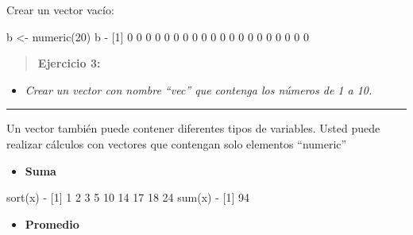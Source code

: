 \documentclass[
]{book}
\newenvironment{Shaded}{\begin{snugshade}}{\end{snugshade}}
\newcommand{\DecValTok}[1]{\textcolor[rgb]{0.00,0.00,0.81}{#1}}
\newcommand{\FunctionTok}[1]{\textcolor[rgb]{0.00,0.00,0.00}{#1}}
\newcommand{\NormalTok}[1]{#1}
\newcommand{\OtherTok}[1]{\textcolor[rgb]{0.56,0.35,0.01}{#1}}
\newcommand{\SpecialCharTok}[1]{\textcolor[rgb]{0.00,0.00,0.00}{#1}}
\providecommand{\tightlist}{%
  \setlength{\itemsep}{0pt}\setlength{\parskip}{0pt}}
\begin{document}
Crear un vector vacío:

\begin{Shaded}
\begin{Highlighting}[]
\NormalTok{b }\OtherTok{\textless{}{-}} \FunctionTok{numeric}\NormalTok{(}\DecValTok{20}\NormalTok{)}
\NormalTok{b}
\SpecialCharTok{{-}}\NormalTok{  [}\DecValTok{1}\NormalTok{] }\DecValTok{0} \DecValTok{0} \DecValTok{0} \DecValTok{0} \DecValTok{0} \DecValTok{0} \DecValTok{0} \DecValTok{0} \DecValTok{0} \DecValTok{0} \DecValTok{0} \DecValTok{0} \DecValTok{0} \DecValTok{0} \DecValTok{0} \DecValTok{0} \DecValTok{0} \DecValTok{0} \DecValTok{0} \DecValTok{0}
\end{Highlighting}
\end{Shaded}

\begin{quote}
\textbf{Ejercicio 3:}
\end{quote}

\begin{itemize}
\tightlist
\item
  \emph{Crear un vector con nombre ``vec'' que contenga los números de 1 a 10.}
\end{itemize}

\begin{center}\rule{0.5\linewidth}{0.5pt}\end{center}

Un vector también puede contener diferentes tipos de variables. Usted puede realizar cálculos con vectores que contengan solo elementos ``numeric''

\begin{itemize}
\tightlist
\item
  \textbf{Suma}
\end{itemize}

\begin{Shaded}
\begin{Highlighting}[]
\FunctionTok{sort}\NormalTok{(x)}
\SpecialCharTok{{-}}\NormalTok{ [}\DecValTok{1}\NormalTok{]  }\DecValTok{1}  \DecValTok{2}  \DecValTok{3}  \DecValTok{5} \DecValTok{10} \DecValTok{14} \DecValTok{17} \DecValTok{18} \DecValTok{24}
\FunctionTok{sum}\NormalTok{(x)}
\SpecialCharTok{{-}}\NormalTok{ [}\DecValTok{1}\NormalTok{] }\DecValTok{94}
\end{Highlighting}
\end{Shaded}

\begin{itemize}
\tightlist
\item
  \textbf{Promedio}
\end{itemize}
\end{document}
